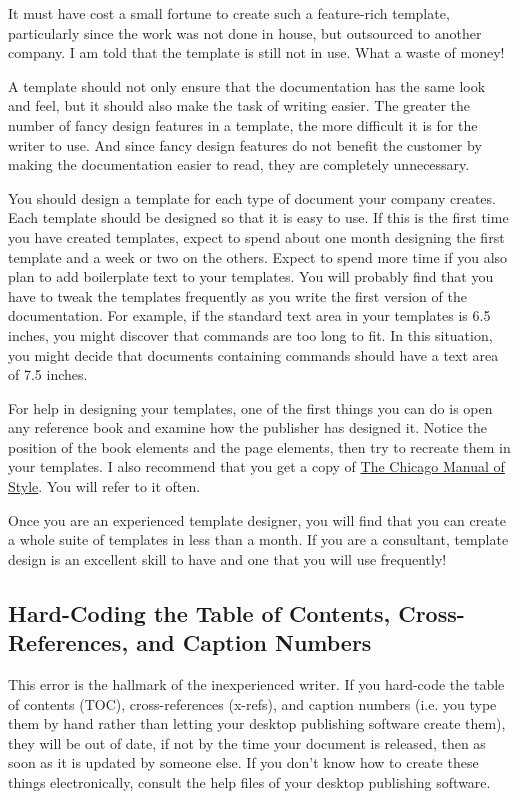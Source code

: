 \documentclass[12pt]{article}
\begin{document}
It must have cost a small fortune to create such a feature-rich template, particularly since the work was not done in house, but outsourced to another company. I am told that the template is still not in use. What a waste of money!

A template should not only ensure that the documentation has the same look and feel, but it should also make the task of writing easier. The greater the number of fancy design features in a template, the more difficult it is for the writer to use. And since fancy design features do not benefit the customer by making the documentation easier to read, they are completely unnecessary.

You should design a template for each type of document your company creates. Each template should be designed so that it is easy to use. If this is the first time you have created templates, expect to spend about one month designing the first template and a week or two on the others. Expect to spend more time if you also plan to add boilerplate text to your templates. You will probably find that you have to tweak the templates frequently as you write the first version of the documentation. For example, if the standard text area in your templates is 6.5 inches, you might discover that commands are too long to fit. In this situation, you might decide that documents containing commands should have a text area of 7.5 inches.

For help in designing your templates, one of the first things you can do is open any reference book and examine how the publisher has designed it. Notice the position of the book elements and the page elements, then try to recreate them in your templates. I also recommend that you get a copy of \href{books-for-technical-writers.html#Chicago}{The Chicago Manual of Style}. You will refer to it often.

Once you are an experienced template designer, you will find that you can create a whole suite of templates in less than a month. If you are a consultant, template design is an excellent skill to have and one that you will use frequently!

\subsection{Hard-Coding the Table of Contents, Cross-References, and Caption Numbers}
This error is the hallmark of the inexperienced writer. If you hard-code the table of contents (TOC), cross-references (x-refs), and caption numbers (i.e. you type them by hand rather than letting your desktop publishing software create them), they will be out of date, if not by the time your document is released, then as soon as it is updated by someone else. If you don't know how to create these things electronically, consult the help files of your desktop publishing software.
\end{document}
